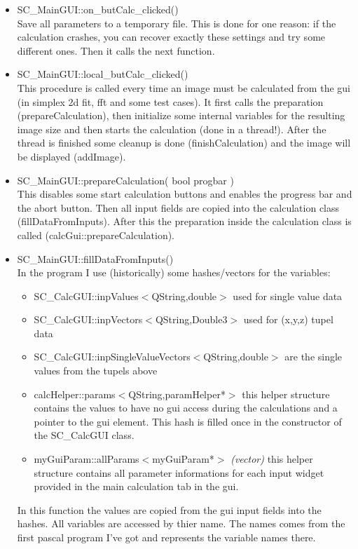 \documentclass[11pt]{article} %
\begin{document}
\begin{itemize}
\item SC\_MainGUI::on\_butCalc\_clicked() \\
	Save all parameters to a temporary file. This is done for one reason: if the calculation crashes, you can recover exactly these settings and try some different ones. Then it calls the next function.

\item SC\_MainGUI::local\_butCalc\_clicked() \\
	This procedure is called every time an image must be calculated from the gui (in simplex 2d fit, fft and some test cases). It first calls the preparation (prepareCalculation), then initialize some internal variables for the resulting image size and then starts the calculation (done in a thread!). After the thread is finished some cleanup is done (finishCalculation) and the image will be displayed (addImage).

\item SC\_MainGUI::prepareCalculation( bool progbar ) \\
	This disables some start calculation buttons and enables the progress bar and the abort button. Then all input fields are copied into the calculation class (fillDataFromInputs). After this the preparation inside the calculation class is called (calcGui::prepareCalculation).

\item SC\_MainGUI::fillDataFromInputs() \\
	In the program I use (historically) some hashes/vectors for the variables:
	\begin{itemize}\itemsep0pt
	\item SC\_CalcGUI::inpValues$<$QString,double$>$ used for single value data
	\item SC\_CalcGUI::inpVectors$<$QString,Double3$>$ used for (x,y,z) tupel data
	\item SC\_CalcGUI::inpSingleValueVectors$<$QString,double$>$ are the single values from the tupels above
	\item calcHelper::params$<$QString,paramHelper*$>$ this helper structure contains the values to have no gui access during the calculations and a pointer to the gui element. This hash is filled once in the constructor of the SC\_CalcGUI class.
	\item myGuiParam::allParams$<$myGuiParam*$>$ {\it (vector)} this helper structure contains all parameter informations for each input widget provided in the main calculation tab in the gui.
	\end{itemize}
In this function the values are copied from the gui input fields into the hashes. All variables are accessed by thier name. The names comes from the first pascal program I've got and represents the variable names there.


\end{itemize}
\end{document}
